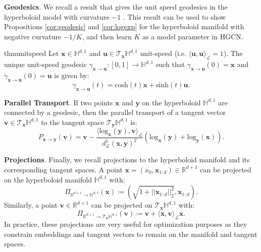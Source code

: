 \documentclass{article}
\newcommand{\xhdr}[1]{{\noindent\bfseries #1}.}
\newcommand{\name}{\textsc{HGCN}\xspace}
\begin{document}
\xhdr{Geodesics} 
We recall a result that gives the unit speed geodesics in the hyperboloid model with curvature $-1$ \cite{robbin2011introduction}.
This result can be used to show Propositions \ref{cor:geodesic} and \ref{cor:logexp} for the hyperboloid manifold with negative curvature $-1/K$, and then learn $K$ as a model parameter in \name. 
\begin{restatable}[]{thm}{unitspeed}
\label{thm:unit_speed}
Let $\mathbf{x}\in\mathbb{H}^{d,1}$ and $\mathbf{u}\in\mathcal{T}_\mathbf{x}\mathbb{H}^{d,1}$ unit-speed (i.e. $\langle\mathbf{u},\mathbf{u}\rangle_\mathcal{L}=1$).
The unique unit-speed geodesic $\gamma_{\mathbf{x}\rightarrow\mathbf{u}}:[0,1]\rightarrow\mathbb{H}^{d,1}$ such that $\gamma_{\mathbf{x}\rightarrow\mathbf{u}}(0)=\mathbf{x}$ and $\dot\gamma_{\mathbf{x}\rightarrow\mathbf{u}}(0)=\mathbf{u}$ is given by:
$$\gamma_{\mathbf{x}\rightarrow\mathbf{u}}(t)=\mathrm{cosh}(t)\mathbf{x}+\mathrm{sinh}(t)\mathbf{u}.$$
\end{restatable}

\xhdr{Parallel Transport}
If two points $\mathbf{x}$ and $\mathbf{y}$ on the hyperboloid $\mathbb{H}^{d,1}$ are connected by a geodesic, then the parallel transport of a tangent vector $\mathbf{v} \in \mathcal{T}_{\mathbf{x}}\mathbb{H}^{d,1}$ to the tangent space $\mathcal{T}_{\mathbf{y}}\mathbb{H}^{d,1}$ is:
\begin{equation}
P_{\mathbf{x}\rightarrow \mathbf{y}}(\mathbf{v})=\mathbf{v}-\frac{\langle\mathrm{log}_\mathbf{x}(\mathbf{y}),\mathbf{v}\rangle_\mathcal{L}}{d^1_\mathcal{L}(\mathbf{x}, \mathbf{y})^2}(\mathrm{log}_\mathbf{x}(\mathbf{y})+\mathrm{log}_\mathbf{y}(\mathbf{x})).
\end{equation}

\xhdr{Projections}
Finally, we recall projections to the hyperboloid manifold and its corresponding tangent spaces. 
A point $\mathbf{x}=(x_0,\mathbf{x}_{1:d})\in\mathbb{R}^{d+1}$ can be projected on the hyperboloid manifold $\mathbb{H}^{d,1}$ with:
\begin{equation}
    \Pi_{\mathbb{R}^{d+1}\rightarrow\mathbb{H}^{d,1}}(\mathbf{x})\coloneqq(\sqrt{1+||\mathbf{x}_{1:d}||_2^2}, \mathbf{x}_{1:d}).\label{eq:proj_hyp}
\end{equation}
Similarly, a point $\mathbf{v}\in\mathbb{R}^{d+1}$ can be projected on $\mathcal{T}_\mathbf{x}\mathbb{H}^{d,1}$ with:
\begin{equation}
    \Pi_{\mathbb{R}^{d+1}\rightarrow\mathcal{T}_\mathbf{x}\mathbb{H}^{d,1}}(\mathbf{v})\coloneqq\mathbf{v}+\langle\mathbf{x},\mathbf{v}\rangle_\mathcal{L}\mathbf{x}.\label{eq:proj_tan}
\end{equation}
In practice, these projections are very useful for optimization purposes as they constrain embeddings and tangent vectors to remain on the manifold and tangent spaces.
\end{document}
